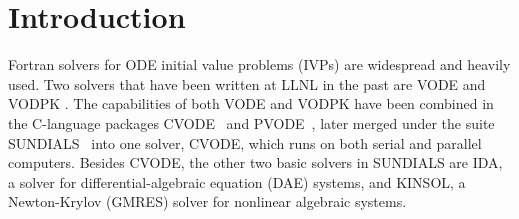 \section{Introduction}\label{s:introduction}

Fortran solvers for ODE initial value problems (IVPs) are widespread and heavily used. 
Two solvers that have been written at LLNL in the past are VODE \cite{BBH:89} 
and VODPK \cite{Byr:92}.
%
%
The capabilities of both VODE and VODPK have been combined in the C-language 
packages CVODE~\cite{CoHi:96} and PVODE~\cite{ByHi:99}, later merged under the
suite SUNDIALS~\cite{HBGLSSW:04} into one solver, CVODE, which runs on both
serial and parallel computers. Besides CVODE, the other two basic solvers in SUNDIALS
are IDA, a solver for differential-algebraic equation (DAE) systems, and
KINSOL, a Newton-Krylov (GMRES) solver for nonlinear algebraic systems.

